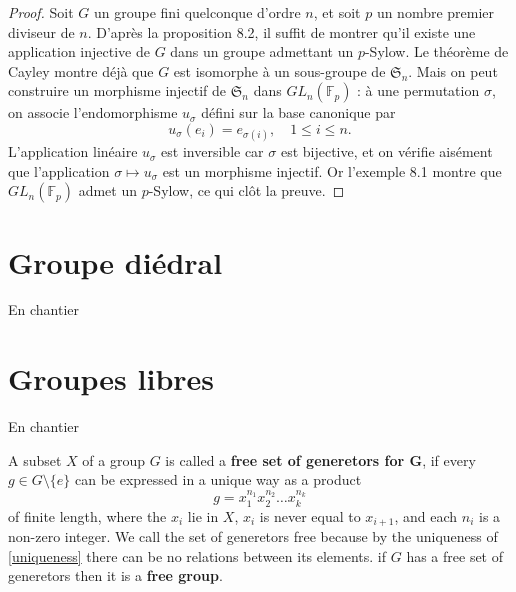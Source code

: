 \begin{proof}
     Soit \( G \) un groupe fini quelconque d’ordre \( n \), et soit \( p \) un nombre premier diviseur de \( n \). D’après la proposition 8.2, il suffit de montrer qu’il existe une application injective de \( G \) dans un groupe admettant un \( p \)-Sylow. Le théorème de Cayley montre déjà que \( G \) est isomorphe à un sous-groupe de \( \mathfrak{S}_n \). Mais on peut construire un morphisme injectif de \( \mathfrak{S}_n \) dans \( GL_n(\mathbb{F}_p) \) : à une permutation \( \sigma \), on associe l’endomorphisme \( u_{\sigma} \) défini sur la base canonique par
    \[
    u_{\sigma}(e_i) = e_{\sigma(i)}, \quad 1 \leq i \leq n.
    \]
    L’application linéaire \( u_{\sigma} \) est inversible car \( \sigma \) est bijective, et on vérifie aisément que l’application \( \sigma \mapsto u_{\sigma} \) est un morphisme injectif. Or l’exemple 8.1 montre que \( GL_n(\mathbb{F}_p) \) admet un \( p \)-Sylow, ce qui clôt la preuve.
\end{proof}
\section{Groupe diédral}

\begin{tcolorbox}[colback=red, colframe=red]
\begin{center}
    En chantier
\end{center}
\end{tcolorbox}


\section{Groupes libres}

\begin{tcolorbox}[colback=red, colframe=red]
\begin{center}
    En chantier
\end{center}
\end{tcolorbox}

\begin{definition}
    A subset $X$ of a group $G$ is called  a \textbf{free set of generetors for G}, if every $g\in G\setminus \{e\}$ can be expressed in a unique way as a product 
    \begin{equation}\label{uniqueness}
        g=x_{1}^{n_1}x_{2}^{n_2}\dotsc x_{k}^{n_k}
    \end{equation}
    of finite length, where the $x_i$ lie in $X$, $x_i$ is never equal to $x_{i+1}$, and each $n_i$ is a non-zero integer. 
    We call the set of generetors free because by the uniqueness of \ref{uniqueness} there can be no relations between its elements.
    if $G$  has a free set of generetors then it is a \textbf{free group}.
\end{definition}

